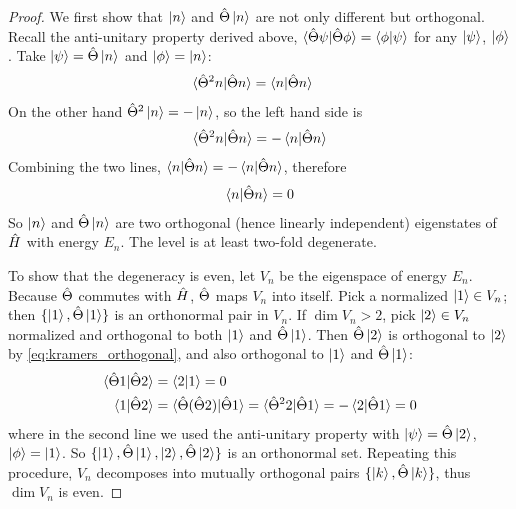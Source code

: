 \begin{proof}
    We first show that $\ket{n}$ and $\hat{\Theta} \ket{n}$ are not only different but orthogonal. Recall the anti-unitary property derived above, $\braket{\hat{\Theta} \psi|\hat{\Theta} \phi} = \braket{\phi|\psi}$ for any $\ket{\psi}$, $\ket{\phi}$. Take $\ket{\psi} = \hat{\Theta} \ket{n}$ and $\ket{\phi} = \ket{n}$:
    \begin{align*}
        \braket{\hat{\Theta}^2 n | \hat{\Theta} n} &= \braket{n | \hat{\Theta} n}
    \end{align*}
    On the other hand $\hat{\Theta}^2 \ket{n} = - \ket{n}$, so the left hand side is
    \begin{align*}
        \braket{\hat{\Theta}^2 n | \hat{\Theta} n} = - \braket{n | \hat{\Theta} n}
    \end{align*}
    Combining the two lines, $\braket{n|\hat{\Theta} n} = - \braket{n|\hat{\Theta} n}$, therefore
    \begin{align}
        \braket{n|\hat{\Theta} n} = 0 \label{eq:kramers_orthogonal}
    \end{align}
    So $\ket{n}$ and $\hat{\Theta} \ket{n}$ are two orthogonal (hence linearly independent) eigenstates of $\hat{H}$ with energy $E_n$. The level is at least two-fold degenerate.

    To show that the degeneracy is even, let $V_n$ be the eigenspace of energy $E_n$. Because $\hat{\Theta}$ commutes with $\hat{H}$, $\hat{\Theta}$ maps $V_n$ into itself. Pick a normalized $\ket{1} \in V_n$; then $\{\ket{1}, \hat{\Theta}\ket{1}\}$ is an orthonormal pair in $V_n$. If $\dim V_n > 2$, pick $\ket{2} \in V_n$ normalized and orthogonal to both $\ket{1}$ and $\hat{\Theta} \ket{1}$. Then $\hat{\Theta}\ket{2}$ is orthogonal to $\ket{2}$ by \cref{eq:kramers_orthogonal}, and also orthogonal to $\ket{1}$ and $\hat{\Theta}\ket{1}$:
    \begin{align*}
        \braket{\hat{\Theta} 1|\hat{\Theta} 2} &= \braket{2|1} = 0 \\
        \braket{1|\hat{\Theta} 2} &= \braket{\hat{\Theta} (\hat{\Theta} 2) | \hat{\Theta} 1} = \braket{\hat{\Theta}^2 2|\hat{\Theta} 1} = - \braket{2|\hat{\Theta} 1} = 0
    \end{align*}
    where in the second line we used the anti-unitary property with $\ket{\psi} = \hat{\Theta}\ket{2}$, $\ket{\phi} = \ket{1}$. So $\{\ket{1}, \hat{\Theta}\ket{1}, \ket{2}, \hat{\Theta}\ket{2}\}$ is an orthonormal set. Repeating this procedure, $V_n$ decomposes into mutually orthogonal pairs $\{\ket{k}, \hat{\Theta}\ket{k}\}$, thus $\dim V_n$ is even.
\end{proof}


